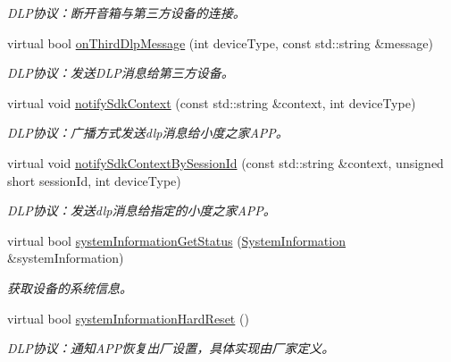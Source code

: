\begin{DoxyCompactItemize}
\begin{DoxyCompactList}\small\item\em D\+L\+P协议：断开音箱与第三方设备的连接。 \end{DoxyCompactList}\item 
virtual bool \hyperlink{classduerOSDcsSDK_1_1sdkInterfaces_1_1ApplicationImplementation_a86a2762383d248b63f5f815f1fbdc2c5}{on\+Third\+Dlp\+Message} (int device\+Type, const std\+::string \&message)
\begin{DoxyCompactList}\small\item\em D\+L\+P协议：发送\+D\+L\+P消息给第三方设备。 \end{DoxyCompactList}\item 
virtual void \hyperlink{classduerOSDcsSDK_1_1sdkInterfaces_1_1ApplicationImplementation_a0e9c517a15e1933d5cb12e8032b34d90}{notify\+Sdk\+Context} (const std\+::string \&context, int device\+Type)
\begin{DoxyCompactList}\small\item\em D\+L\+P协议：广播方式发送dlp消息给小度之家\+A\+P\+P。 \end{DoxyCompactList}\item 
virtual void \hyperlink{classduerOSDcsSDK_1_1sdkInterfaces_1_1ApplicationImplementation_a43f7f49462fc094905cf38b69bb4e848}{notify\+Sdk\+Context\+By\+Session\+Id} (const std\+::string \&context, unsigned short session\+Id, int device\+Type)
\begin{DoxyCompactList}\small\item\em D\+L\+P协议：发送dlp消息给指定的小度之家\+A\+P\+P。 \end{DoxyCompactList}\item 
virtual bool \hyperlink{classduerOSDcsSDK_1_1sdkInterfaces_1_1ApplicationImplementation_aab4fcea97b804159073abf54e25075bb}{system\+Information\+Get\+Status} (\hyperlink{structduerOSDcsSDK_1_1sdkInterfaces_1_1SystemInformation}{System\+Information} \&system\+Information)
\begin{DoxyCompactList}\small\item\em 获取设备的系统信息。 \end{DoxyCompactList}\item 
virtual bool \hyperlink{classduerOSDcsSDK_1_1sdkInterfaces_1_1ApplicationImplementation_a8ce2c9ad1c35f8c75a0dad0731b8850e}{system\+Information\+Hard\+Reset} ()
\begin{DoxyCompactList}\small\item\em D\+L\+P协议：通知\+A\+P\+P恢复出厂设置，具体实现由厂家定义。 \end{DoxyCompactList}\item 

\end{DoxyCompactItemize}
